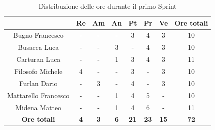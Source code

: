\begin{table}[H]
  \centering
  \renewcommand{\arraystretch}{1.8}
  \begin{tabular}{c|c|c|c|c|c|c|c}
    \rowcolor[HTML]{125E28}
    \multicolumn{1}{c}{\color[HTML]{FFFFFF}\textbf{ Nominativo }}
                         & \multicolumn{1}{c}{\color[HTML]{FFFFFF}\textbf{ Re }}
                         & \multicolumn{1}{c}{\color[HTML]{FFFFFF}\textbf{ Am}}
                         & \multicolumn{1}{c}{\color[HTML]{FFFFFF}\textbf{ An }}
                         & \multicolumn{1}{c}{\color[HTML]{FFFFFF}\textbf{ Pt }}
                         & \multicolumn{1}{c}{\color[HTML]{FFFFFF}\textbf{ Pr }}
                         & \multicolumn{1}{c}{\color[HTML]{FFFFFF}\textbf{ Ve }}
                         & \multicolumn{1}{c}{\color[HTML]{FFFFFF}\textbf{ Ore totali }}                                                                                   \\
    \hline
    Bugno Francesco      & -                                                             & -          & -          & 3           & 4           & 3           & 10          \\
    Busacca Luca         & -                                                             & -          & 3          & -           & 4           & 3           & 10          \\
    Carturan Luca        & -                                                             & -          & 1          & 3           & 4           & 3           & 11          \\
    Filosofo Michele     & 4                                                             & -          & -          & 3           & -           & 3           & 10          \\
    Furlan Dario         & -                                                             & 3          & -          & 4           & -           & 3           & 10          \\
    Mattarello Francesco & -                                                             & -          & 1          & 4           & 5           & -           & 10          \\
    Midena Matteo        & -                                                             & -          & 1          & 4           & 6           & -           & 11          \\
    \textbf{Ore totali}  & \textbf{4}                                                    & \textbf{3} & \textbf{6} & \textbf{21} & \textbf{23} & \textbf{15} & \textbf{72}
  \end{tabular}
  \caption{Distribuzione delle ore durante il primo Sprint}
\end{table}

